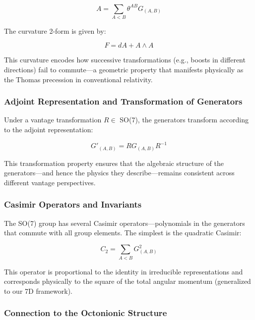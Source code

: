\documentclass{article}
\begin{document}
\begin{equation}
A = \sum_{A<B} \theta^{AB} G_{(A,B)}
\end{equation}

The curvature 2-form is given by:

\begin{equation}
F = dA + A \wedge A
\end{equation}

This curvature encodes how successive transformations (e.g., boosts in different directions) fail to commute—a geometric property that manifests physically as the Thomas precession in conventional relativity.

\subsubsection{Adjoint Representation and Transformation of Generators}

Under a vantage transformation $R \in$ SO(7), the generators transform according to the adjoint representation:

\begin{equation}
G'_{(A,B)} = R G_{(A,B)} R^{-1}
\end{equation}

This transformation property ensures that the algebraic structure of the generators—and hence the physics they describe—remains consistent across different vantage perspectives.

\subsubsection{Casimir Operators and Invariants}

The SO(7) group has several Casimir operators—polynomials in the generators that commute with all group elements. The simplest is the quadratic Casimir:

\begin{equation}
C_2 = \sum_{A<B} G_{(A,B)}^2
\end{equation}

This operator is proportional to the identity in irreducible representations and corresponds physically to the square of the total angular momentum (generalized to our 7D framework).

\subsubsection{Connection to the Octonionic Structure}
\end{document}
